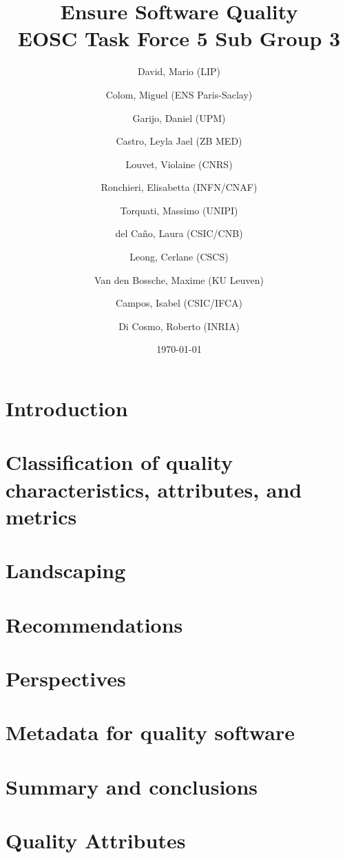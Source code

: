 \documentclass[a4paper, 10pt]{article}
\title{Ensure Software Quality \\
    \large EOSC Task Force 5 Sub Group 3}
\author{
    David, Mario (LIP) \orcidlink{0000-0003-1802-5356} \and
    Colom, Miguel (ENS Paris-Saclay) \orcidlink{0000-0003-2636-0656} \and
    Garijo, Daniel (UPM) \orcidlink{0000-0003-0454-7145} \and
    Castro, Leyla Jael (ZB MED) \orcidlink{0000-0003-3986-0510} \and
    Louvet, Violaine (CNRS) \orcidlink{0000-0002-8742-8952} \and
    Ronchieri, Elisabetta (INFN/CNAF) \orcidlink{0000-0002-7341-6491} \and
    Torquati, Massimo (UNIPI) \orcidlink{0000-0001-6323-3459} \and
    del Ca\~{n}o, Laura (CSIC/CNB) \orcidlink{0000-0003-0981-2040} \and
    Leong, Cerlane (CSCS)  \orcidlink{0000-0001-8241-6277} \and
    Van den Bossche, Maxime (KU Leuven) \orcidlink{0000-0002-0938-0156} \and
    Campos, Isabel (CSIC/IFCA) \orcidlink{0000-0002-9350-0383} \and
    Di Cosmo, Roberto (INRIA) \orcidlink{0000-0002-7493-5349}
}
\date{\today}
\begin{document}
\maketitle
\tableofcontents
\thispagestyle{empty} 
\clearpage
{} 

\section{Introduction}
\label{sec:introduction}

\newpage

\section{Classification of quality characteristics, attributes, and metrics}
\label{sec:classification}

\newpage

\section{Landscaping}
\label{sec:landscaping}

\newpage

\section{Recommendations}
\label{sec:recommendations}

\newpage

\section{Perspectives}
\label{sec:perspectives}

\newpage

\section{Metadata for quality software}
\label{sec:metadata}

\newpage

\section{Summary and conclusions}
\label{sec:summary}

\newpage

\appendix
\section{Quality Attributes}
\label{appendix_qa}


\newpage
\printbibliography
\end{document}
